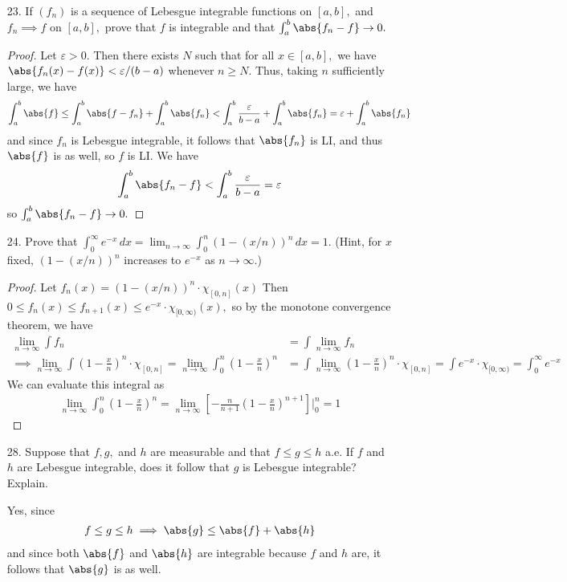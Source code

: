 \documentclass{article}
\begin{document}
\begin{itemize}
	\item[23.] If $(f_n)$ is a sequence of Lebesgue integrable functions on $[a, b],$ and $f_n\implies f$ on $[a, b],$ prove that $f$ is integrable and that $\int_a^b \abs{f_n-f}\to 0.$
		\begin{proof}
			Let $\varepsilon>0.$ Then there exists $N$ such that for all $x\in[a, b],$ we have $\abs{f_n(x)-f(x)}<\varepsilon/(b-a)$ whenever $n\ge N.$ Thus, taking $n$ sufficiently large, we have
			\begin{align*}
				\int_a^b \abs{f} \le \int_a^b \abs{f-f_n} + \int_a^b \abs{f_n} < \int_a^b \frac{\varepsilon}{b-a} + \int_a^b\abs{f_n} = \varepsilon + \int_a^b \abs{f_n}
			\end{align*}
			and since $f_n$ is Lebesgue integrable, it follows that $\abs{f_n}$ is LI, and thus $\abs{f}$ is as well, so $f$ is LI. We have
			\begin{align*}
				\int_a^b \abs{f_n-f} <\int_a^b \frac{\varepsilon}{b-a} = \varepsilon
			\end{align*}
			so $\int_a^b \abs{f_n-f}\to 0.$
		\end{proof}

	\item[24.] Prove that $\int_0^\infty e^{-x}\, dx = \lim_{n\to\infty} \int_0^n (1-(x/n))^n\, dx=1.$ (Hint, for $x$ fixed, $(1-(x/n))^n$ increases to $e^{-x}$ as $n\to\infty.$)
		\begin{proof}
			Let $f_n(x)=(1-(x/n))^n\cdot \chi_{[0, n]}(x)$ Then $0\le f_n(x)\le f_{n+1}(x)\le e^{-x}\cdot \chi_{[0, \infty)}(x),$ so by the monotone convergence theorem, we have
			\begin{align*}
				\lim_{n\to\infty} \int f_n &= \int \lim_{n\to\infty} f_n \\
				\implies \lim_{n\to\infty} \int \left( 1-\frac{x}{n} \right)^n\cdot\chi_{[0, n]} = \lim_{n\to\infty} \int_0^n \left( 1-\frac{x}{n} \right)^n &= \int \lim_{n\to\infty} \left( 1- \frac{x}{n} \right)^n \cdot \chi_{[0, n]}= \int e^{-x}\cdot \chi_{[0, \infty)} = \int_0^\infty e^{-x}
			\end{align*}
			We can evaluate this integral as
			\begin{align*}
				\lim_{n\to\infty} \int_0^n \left( 1-\frac{x}{n} \right)^n = \lim_{n\to\infty}\left[ -\frac{n}{n+1}\left( 1-\frac{x}{n} \right)^{n+1} \right]\bigg|_0^n = 1
			\end{align*}
		\end{proof}

	\item[28.] Suppose that $f, g,$ and $h$ are measurable and that $f\le g\le h$ a.e. If $f$ and $h$ are Lebesgue integrable, does it follow that $g$ is Lebesgue integrable? Explain.
		\begin{soln}
			Yes, since
			\begin{align*}
				f\le g\le h \implies \abs{g}\le \abs{f}+\abs{h}
			\end{align*}
			and since both $\abs{f}$ and $\abs{h}$ are integrable because $f$ and $h$ are, it follows that $\abs{g}$ is as well.
		\end{soln}


\end{itemize}
\end{document}

